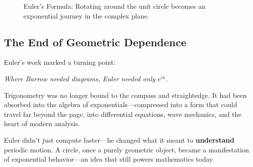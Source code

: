 \begin{figure}[H]
    \centering
    \caption{Euler’s Formula: Rotating around the unit circle becomes an exponential journey in the complex plane.}
\end{figure}

\subsection{The End of Geometric Dependence}

Euler’s work marked a turning point:

\begin{center}
\textit{Where Barrow needed diagrams, Euler needed only \( e^{ix} \).}
\end{center}

Trigonometry was no longer bound to the compass and straightedge. It had been absorbed into the algebra of exponentials—compressed into a form that could travel far beyond the page, into differential equations, wave mechanics, and the heart of modern analysis.

\vspace{1em}

Euler didn’t just compute faster—he changed what it meant to \textbf{understand} periodic motion.  
A circle, once a purely geometric object, became a manifestation of exponential behavior—an idea that still powers mathematics today.
